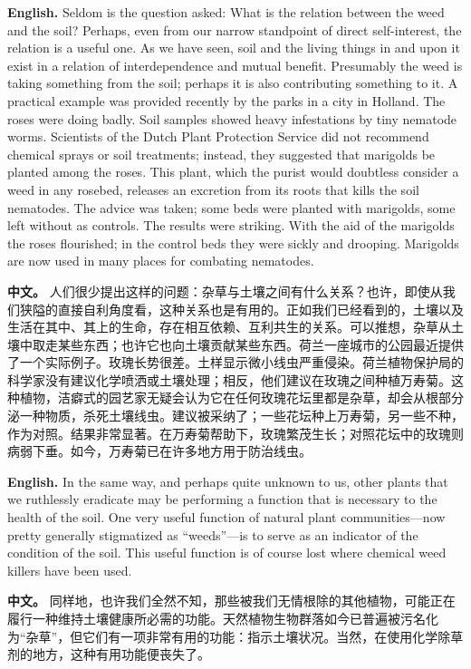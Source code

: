 \noindent\textbf{English.} Seldom is the question asked: What is the relation between the weed and the soil? Perhaps, even from our narrow standpoint of direct self-interest, the relation is a useful one. As we have seen, soil and the living things in and upon it exist in a relation of interdependence and mutual benefit. Presumably the weed is taking something from the soil; perhaps it is also contributing something to it. A practical example was provided recently by the parks in a city in Holland. The roses were doing badly. Soil samples showed heavy infestations by tiny nematode worms. Scientists of the Dutch Plant Protection Service did not recommend chemical sprays or soil treatments; instead, they suggested that marigolds be planted among the roses. This plant, which the purist would doubtless consider a weed in any rosebed, releases an excretion from its roots that kills the soil nematodes. The advice was taken; some beds were planted with marigolds, some left without as controls. The results were striking. With the aid of the marigolds the roses flourished; in the control beds they were sickly and drooping. Marigolds are now used in many places for combating nematodes.
\par
\noindent\textbf{中文。} 人们很少提出这样的问题：杂草与土壤之间有什么关系？也许，即使从我们狭隘的直接自利角度看，这种关系也是有用的。正如我们已经看到的，土壤以及生活在其中、其上的生命，存在相互依赖、互利共生的关系。可以推想，杂草从土壤中取走某些东西；也许它也向土壤贡献某些东西。荷兰一座城市的公园最近提供了一个实际例子。玫瑰长势很差。土样显示微小线虫严重侵染。荷兰植物保护局的科学家没有建议化学喷洒或土壤处理；相反，他们建议在玫瑰之间种植万寿菊。这种植物，洁癖式的园艺家无疑会认为它在任何玫瑰花坛里都是杂草，却会从根部分泌一种物质，杀死土壤线虫。建议被采纳了；一些花坛种上万寿菊，另一些不种，作为对照。结果非常显著。在万寿菊帮助下，玫瑰繁茂生长；对照花坛中的玫瑰则病弱下垂。如今，万寿菊已在许多地方用于防治线虫。
\par\medskip

\noindent\textbf{English.} In the same way, and perhaps quite unknown to us, other plants that we ruthlessly eradicate may be performing a function that is necessary to the health of the soil. One very useful function of natural plant communities---now pretty generally stigmatized as ``weeds''---is to serve as an indicator of the condition of the soil. This useful function is of course lost where chemical weed killers have been used.
\par
\noindent\textbf{中文。} 同样地，也许我们全然不知，那些被我们无情根除的其他植物，可能正在履行一种维持土壤健康所必需的功能。天然植物生物群落如今已普遍被污名化为“杂草”，但它们有一项非常有用的功能：指示土壤状况。当然，在使用化学除草剂的地方，这种有用功能便丧失了。
\par\medskip

